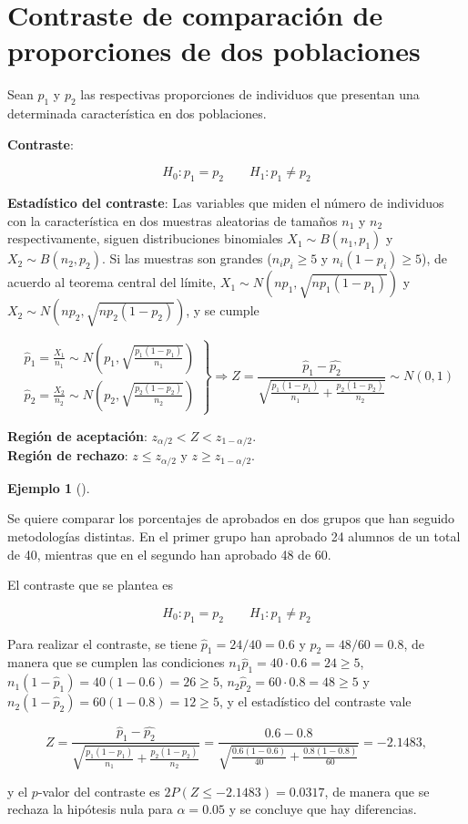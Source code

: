 \documentclass[
  a4paper,
]{scrreport}
\theoremstyle{plain}
\theoremstyle{definition}
\newtheorem{example}{Ejemplo}[chapter]
\theoremstyle{definition}
\theoremstyle{remark}
\begin{document}
\section{Contraste de comparación de proporciones de dos
poblaciones}\label{contraste-de-comparaciuxf3n-de-proporciones-de-dos-poblaciones}

Sean \(p_1\) y \(p_2\) las respectivas proporciones de individuos que
presentan una determinada característica en dos poblaciones.

\textbf{Contraste}:

\[
H_0: p_1=p_2\qquad H_1: p_1\neq p_2
\]

\textbf{Estadístico del contraste}: Las variables que miden el número de
individuos con la característica en dos muestras aleatorias de tamaños
\(n_1\) y \(n_2\) respectivamente, siguen distribuciones binomiales
\(X_1\sim B(n_1,p_1)\) y \(X_2\sim B(n_2,p_2)\). Si las muestras son
grandes (\(n_ip_i\geq 5\) y \(n_i(1-p_i)\geq 5\)), de acuerdo al teorema
central del límite, \(X_1\sim N(np_1,\sqrt{np_1(1-p_1)})\) y
\(X_2\sim N(np_2,\sqrt{np_2(1-p_2)})\), y se cumple

\[
\left.
\begin{array}{l}
\hat{p}_1=\frac{X_1}{n_1} \sim N\left(p_1,\sqrt{\frac{p_1(1-p_1)}{n_1}}\right) \\
\hat{p}_2=\frac{X_2}{n_2} \sim N\left(p_2,\sqrt{\frac{p_2(1-p_2)}{n_2}}\right)
\end{array}
\right\}
\Rightarrow Z = \frac{\hat{p}_1-\hat{p_2}}{\sqrt{\frac{p_1(1-p_1)}{n_1}+\frac{p_2(1-p_2)}{n_2}}}\sim N(0,1)
\]

\textbf{Región de aceptación}: \(z_{\alpha/2}< Z < z_{1-\alpha/2}\).\\
\textbf{Región de rechazo}: \(z\leq z_{\alpha/2}\) y
\(z\geq z_{1-\alpha/2}\).

\begin{example}[]\protect\hypertarget{exm-contraste-diferencia-proporciones}{}\label{exm-contraste-diferencia-proporciones}

Se quiere comparar los porcentajes de aprobados en dos grupos que han
seguido metodologías distintas. En el primer grupo han aprobado 24
alumnos de un total de 40, mientras que en el segundo han aprobado 48 de
60.

El contraste que se plantea es

\[
H_0: p_1=p_2\qquad H_1: p_1\neq p_2
\]

Para realizar el contraste, se tiene \(\hat{p}_1=24/40= 0.6\) y
\(\hat{p}_2=48/60=0.8\), de manera que se cumplen las condiciones
\(n_1\hat{p}_1=40\cdot 0.6=24\geq 5\),
\(n_1(1-\hat{p}_1)=40(1-0.6)=26\geq 5\),
\(n_2\hat{p}_2=60\cdot 0.8=48\geq 5\) y
\(n_2(1-\hat{p}_2)=60(1-0.8)=12\geq 5\), y el estadístico del contraste
vale

\[
Z = \frac{\hat{p}_1-\hat{p_2}}{\sqrt{\frac{p_1(1-p_1)}{n_1}+\frac{p_2(1-p_2)}{n_2}}} = \frac{0.6-0.8}{\sqrt{\frac{0.6(1-0.6)}{40}+\frac{0.8(1-0.8)}{60}}} = -2.1483,
\]

y el \(p\)-valor del contraste es \(2P(Z\leq -2.1483)= 0.0317\), de
manera que se rechaza la hipótesis nula para \(\alpha=0.05\) y se
concluye que hay diferencias.

\end{example}
\end{document}
